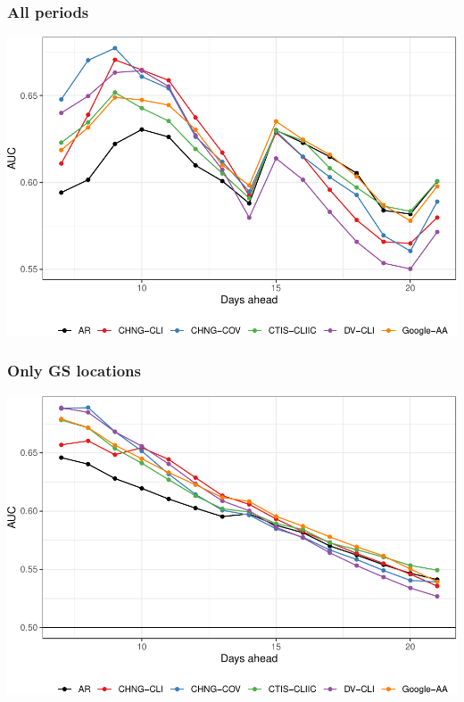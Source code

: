 \documentclass[9pt,twoside,lineno]{pnas-new}
\begin{document}
\hypertarget{all-periods-1}{%
\subsubsection{All periods}\label{all-periods-1}}

\begin{center}\includegraphics[width=\linewidth]{fig/hot-alldates-1} \end{center}

\hypertarget{only-gs-locations-1}{%
\subsubsection{Only GS locations}\label{only-gs-locations-1}}

\begin{center}\includegraphics[width=\linewidth]{fig/hot-gs-locations-1} \end{center}
\end{document}
